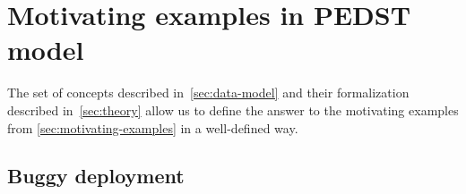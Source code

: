 \begin{comment}
KOMENTARZ PEWNIE NIE TRAFI DO TEKSTU
Soundness requirements, towards data produced in the local model, are clear from the \textit{observe} procedure. At the same time, satisfying these requirements does not guarantee that the traces actually represent the work performed by the system.

TODO: define requirements towards how the system needs to be used, relate individual requirements to \textit{where-provenance}  (execution reads object A and writes object A again), \textit{dependency-provenance}  (execution reads), \textit{semiring-provenance}  (ability to ``forget''  stop tracing something) and others.
\end{comment}

\section{Motivating examples in PEDST model}

The set of concepts described in~\cref{sec:data-model} and their formalization described in~\cref{sec:theory} allow us to define the answer to the motivating examples from \cref{sec:motivating-examples} in a well-defined way.

\subsection{Buggy deployment}\label{sec:motivating-ex1-pedst}


